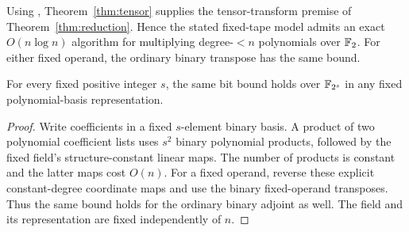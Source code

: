 \begin{corollary}\label{cor:tensor-multiplication}
Using \cite[Lemma~12]{OpenAI26}, Theorem~\ref{thm:tensor} supplies the tensor-transform premise of Theorem~\ref{thm:reduction}. Hence the stated fixed-tape model admits an exact $O(n\log n)$ algorithm for multiplying degree-$<n$ polynomials over $\mathbb F_2$. For either fixed operand, the ordinary binary transpose has the same bound.
\end{corollary}

\begin{corollary}\label{cor:fixed-characteristic-two}
For every fixed positive integer $s$, the same bit bound holds over
$\mathbb F_{2^s}$ in any fixed polynomial-basis representation.
\end{corollary}
\begin{proof}
Write coefficients in a fixed $s$-element binary basis. A product of
two polynomial coefficient lists uses $s^2$ binary polynomial products,
followed by the fixed field's structure-constant linear maps. The
number of products is constant and the latter maps cost $O(n)$.
For a fixed operand, reverse these explicit constant-degree coordinate
maps and use the binary fixed-operand transposes. Thus the same bound
holds for the ordinary binary adjoint as well. The field and its
representation are fixed independently of $n$.
\end{proof}

